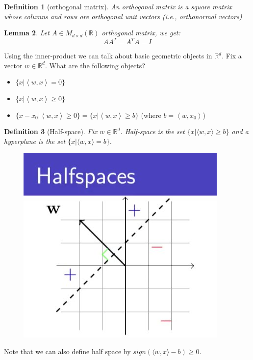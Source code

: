 \documentclass[11pt, oneside]{article}   	%
\newtheorem{lemma}{Lemma}
\newtheorem{definition}[lemma]{Definition}
\begin{document}
\begin{definition}[orthogonal matrix]
An orthogonal matrix is a square matrix whose columns and rows are orthogonal unit vectors (i.e., orthonormal vectors)
\end{definition}

\begin{lemma}
Let $A\in M_{d\times d}(\mathbb{R})$ orthogonal matrix, we get:
$$AA^{T}=A^{T}A=I$$
\end{lemma}
 
 Using the inner-product we can talk about basic geometric objects in $\mathbb R^d$.
 Fix a vector $w\in \mathbb R^d$. What are the following objects?
 \begin{itemize}
 \item $\{x|\left<w,x\right>=0\}$
 \item $\{x|\left<w,x\right>\geq 0\}$
 \item $\{x-x_0|\left<w,x\right>\geq0\} = \{x|\left<w,x\right>\geq b\}$ (where $b=\left<w,x_0\right>$)
 \end{itemize}
\begin{definition}[Half-space]
 Fix $w\in \mathbb R^d$.  \emph{Half-space} is the set $\{x |\langle w,x\rangle \geq b\}$ and a \emph{hyperplane} is the set $\{x |\langle w,x\rangle = b\}.$
\end{definition}

\begin{figure}[h!]
  \centering
    \includegraphics[scale=0.6]{halfspace.jpg}  
\end{figure}
 Note that we can also define half space by $sign(\langle w,x \rangle-b)\ge 0$.
\end{document}
